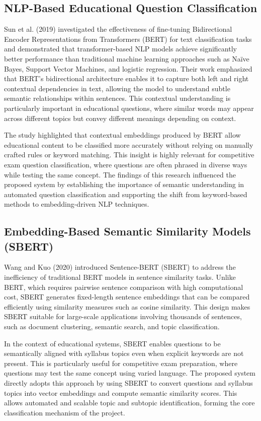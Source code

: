 \begin{sloppypar}
\subsection{NLP-Based Educational Question Classification}

Sun et al. (2019) \cite{sun2019bert} investigated the effectiveness of fine-tuning Bidirectional Encoder Representations from Transformers (BERT) for text classification tasks and demonstrated that transformer-based NLP models achieve significantly better performance than traditional machine learning approaches such as Naïve Bayes, Support Vector Machines, and logistic regression. Their work emphasized that BERT's bidirectional architecture enables it to capture both left and right contextual dependencies in text, allowing the model to understand subtle semantic relationships within sentences. This contextual understanding is particularly important in educational questions, where similar words may appear across different topics but convey different meanings depending on context.

The study highlighted that contextual embeddings produced by BERT allow educational content to be classified more accurately without relying on manually crafted rules or keyword matching. This insight is highly relevant for competitive exam question classification, where questions are often phrased in diverse ways while testing the same concept. The findings of this research influenced the proposed system by establishing the importance of semantic understanding in automated question classification and supporting the shift from keyword-based methods to embedding-driven NLP techniques.

\subsection{Embedding-Based Semantic Similarity Models (SBERT)}

Wang and Kuo (2020) \cite{wang2020sbert} introduced Sentence-BERT (SBERT) to address the inefficiency of traditional BERT models in sentence similarity tasks. Unlike BERT, which requires pairwise sentence comparison with high computational cost, SBERT generates fixed-length sentence embeddings that can be compared efficiently using similarity measures such as cosine similarity. This design makes SBERT suitable for large-scale applications involving thousands of sentences, such as document clustering, semantic search, and topic classification.

In the context of educational systems, SBERT enables questions to be semantically aligned with syllabus topics even when explicit keywords are not present. This is particularly useful for competitive exam preparation, where questions may test the same concept using varied language. The proposed system directly adopts this approach by using SBERT to convert questions and syllabus topics into vector embeddings and compute semantic similarity scores. This allows automated and scalable topic and subtopic identification, forming the core classification mechanism of the project.


\end{sloppypar}
